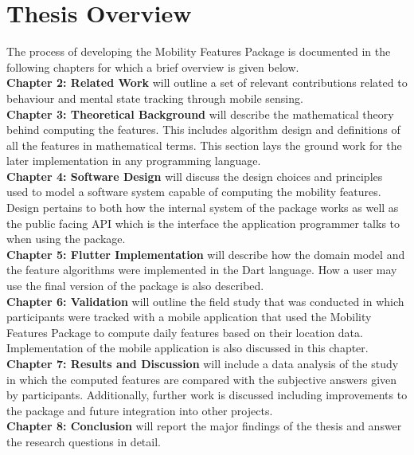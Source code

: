 \section{Thesis Overview}
The process of developing the Mobility Features Package is documented in the following chapters for which a brief overview is given below.\\

\textbf{Chapter 2: Related Work} will outline a set of relevant contributions related to behaviour and mental state tracking through mobile sensing. \\

\textbf{Chapter 3: Theoretical Background} will describe the mathematical theory behind computing the features. This includes algorithm design and definitions of all the features in mathematical terms. This section lays the ground work for the later implementation in any programming language.\\

\textbf{Chapter 4: Software Design} will discuss the design choices and principles used to model a software system capable of computing the mobility features. Design pertains to both how the internal system of the package works as well as the public facing API which is the interface the application programmer talks to when using the package.\\

\textbf{Chapter 5: Flutter Implementation} will describe how the domain model and the feature algorithms were implemented in the Dart language. How a user may use the final version of the package is also described.\\

\textbf{Chapter 6: Validation} will outline the field study that was conducted in which participants were tracked with a mobile application that used the Mobility Features Package to compute daily features based on their location data. Implementation of the mobile application is also discussed in this chapter.\\

\textbf{Chapter 7: Results and Discussion} will include a data analysis of the study in which the computed features are compared with the subjective answers given by participants. Additionally, further work is discussed including improvements to the package and future integration into other projects.\\

\textbf{Chapter 8: Conclusion} will report the major findings of the thesis and answer the research questions in detail.\\
